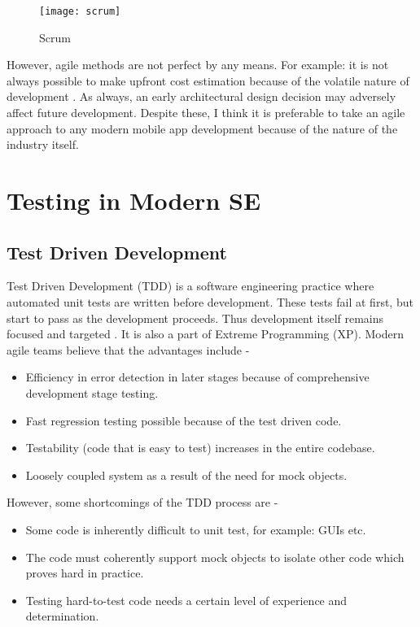 \begin{figure}[!h]
  \centering
    \texttt{[image: scrum]}
  	\caption{Scrum}
  \label{Figure:scrum}
\end{figure}


However, agile methods are not perfect by any means. For example: it is not always possible to make upfront cost estimation because of the volatile nature of development \cite{Ramesh:2010}. As always, an early architectural design decision may adversely affect future development. Despite these, I think it is preferable to take an agile approach to any modern mobile app development \cite{Wasserman:2010} because of the nature of the industry itself.

\section{Testing in Modern SE}
\label{sec:testing}

\subsection{Test Driven Development}

Test Driven Development (TDD) is a software engineering practice where automated unit tests are written before development. These tests fail at first, but start to pass as the development proceeds. Thus development itself remains focused and targeted \cite{Williams:2003}. It is also a part of Extreme Programming (XP). Modern agile teams believe that the advantages include \cite{George:2004} - 

\begin{itemize}
	\item Efficiency in error detection in later stages because of comprehensive development stage testing.
	\item Fast regression testing possible because of the test driven code.
	\item Testability (code that is easy to test) increases in the entire codebase.
	\item Loosely coupled system as a result of the need for mock objects.
\end{itemize}

However, some shortcomings of the TDD process are \cite{George:2004} - 

\begin{itemize}
	\item Some code is inherently difficult to unit test, for example: GUIs etc.
	\item The code must coherently support mock objects to isolate other code which proves hard in practice.
	\item Testing hard-to-test code needs a certain level of experience and determination.
\end{itemize}

